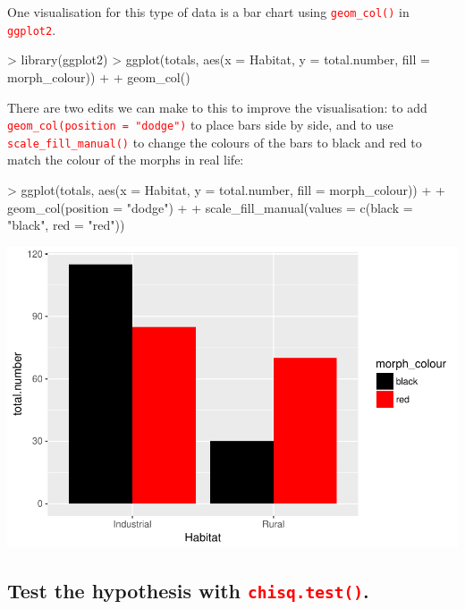 \documentclass[a4paper,12pt]{article}
\newcommand\code[1]{\textcolor{red}{\texttt{#1}}}
\begin{document}
One visualisation for this type of data is a bar chart using \code{geom\_col()} in \code{ggplot2}.


\begin{shaded}
\begin{Schunk}
\begin{Sinput}
> library(ggplot2)
> ggplot(totals, aes(x = Habitat, y = total.number, fill = morph_colour)) +
+   geom_col() 
\end{Sinput}
\end{Schunk}
\end{shaded}

There are two edits we can make to this to improve the visualisation: to add \code{geom\_col(position = "dodge")} to place bars side by side, and to use \code{scale\_fill\_manual()} to change the colours of the bars to black and red to match the colour of the morphs in real life:


\begin{shaded}
\begin{Schunk}
\begin{Sinput}
> ggplot(totals, aes(x = Habitat, y = total.number, fill = morph_colour)) +
+   geom_col(position = "dodge") +
+   scale_fill_manual(values = c(black = "black", red = "red"))
\end{Sinput}
\end{Schunk}
\includegraphics{1_Stats_Course_Notes-knitr-008}
\end{shaded}

\subsection{Test the hypothesis with \code{chisq.test()}.}
\end{document}

